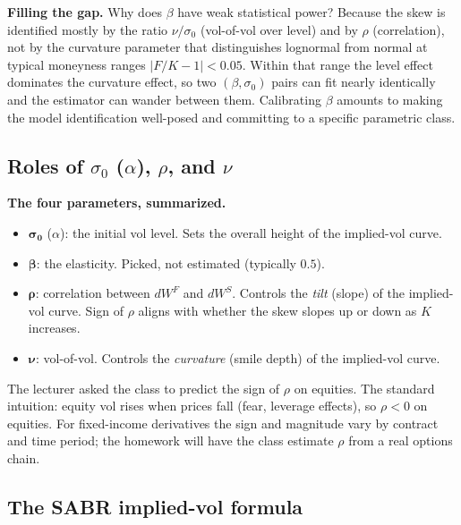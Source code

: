 \begin{tipblock}
\textbf{Filling the gap.} Why does $\beta$ have weak statistical
power? Because the skew is identified mostly by the ratio
$\nu / \sigma_0$ (vol-of-vol over level) and by $\rho$ (correlation),
not by the curvature parameter that distinguishes lognormal from
normal at typical moneyness ranges $|F/K - 1| < 0.05$. Within that
range the level effect dominates the curvature effect, so two
$(\beta, \sigma_0)$ pairs can fit nearly identically and the
estimator can wander between them. Calibrating $\beta$ amounts to
making the model identification well-posed and committing to a
specific parametric class.
\end{tipblock}

\subsection{Roles of $\sigma_0$ ($\alpha$), $\rho$, and $\nu$}\label{L7-sec:rho-nu}

\begin{keyblock}
\textbf{The four parameters, summarized.}
\begin{itemize}
  \item $\boldsymbol{\sigma_0}$ ($\alpha$): the initial vol level.
        Sets the overall height of the implied-vol curve.
  \item $\boldsymbol{\beta}$: the elasticity. Picked, not estimated
        (typically $0.5$).
  \item $\boldsymbol{\rho}$: correlation between $dW^F$ and $dW^S$.
        Controls the \emph{tilt} (slope) of the implied-vol curve.
        Sign of $\rho$ aligns with whether the skew slopes up or
        down as $K$ increases.
  \item $\boldsymbol{\nu}$: vol-of-vol. Controls the \emph{curvature}
        (smile depth) of the implied-vol curve.
\end{itemize}
\end{keyblock}

The lecturer asked the class to predict the sign of $\rho$ on equities.
The standard intuition: equity vol rises when prices fall (fear,
leverage effects), so $\rho < 0$ on equities. For fixed-income
derivatives the sign and magnitude vary by contract and time period;
the homework will have the class estimate $\rho$ from a real options
chain.

\subsection{The SABR implied-vol formula}\label{L7-sec:sabrformula}

